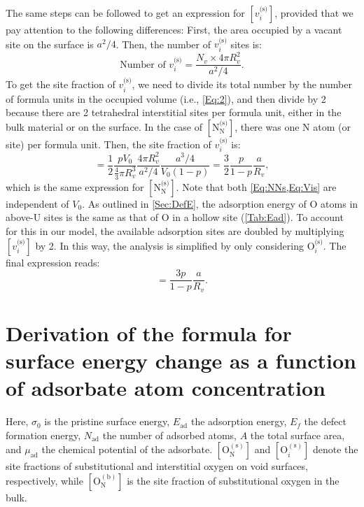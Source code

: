 \documentclass[preprint,12pt,sort&compress]{elsarticle}
\newcommand{\?}{\stackrel{?}{=}}
\begin{document}
The same steps can be followed to get an expression for $[v_i^\text{(s)}]$, provided that we pay attention to the following differences: First, the area occupied by a vacant site on the surface is $a^2/4$. Then, the number of $v_i^\text{(s)}$ sites is:
\begin{equation}
\text{Number of } v_i^\text{(s)} = \frac{ N_v \times 4 \pi R_v^2 }{ a^2 / 4 }.
\end{equation}
To get the site fraction of $v_i^\text{(s)}$, we need to divide its total number by the number of formula units in the occupied volume (i.e., \cref{Eq:2}), and then divide by 2 because there are 2 tetrahedral interstitial sites per formula unit, either in the bulk material or on the surface. In the case of $[ \text{N}_\text{N}^\text{(s)} ]$, there was one N atom (or site) per formula unit. Then, the site fraction of $v_i^\text{(s)}$ is: 
\begin{equation}
[ v_i^\text{(s)} ] = \frac{1}{2} \frac{p V_0}{ \frac{4}{3} \pi R_v^3 } \frac{4 \pi R_v^2}{ a^2/4}  \frac{ a^3/4 }{ V_0 (1 - p) } = \frac{3}{2} \frac{p}{1-p} \frac{a}{R_v},
\label{Eq:Vis}
\end{equation}
which is the same expression for $[ \text{N}_\text{N}^\text{(s)} ]$. Note that both \cref{Eq:NNs,Eq:Vis} are independent of $V_0$. As outlined in \cref{Sec:DefE}, the adsorption energy of O atoms in above-U sites is the same as that of O in a hollow site (\cref{Tab:Ead}). To account for this in our model, the available adsorption sites are doubled by multiplying $[ v_i^\text{(s)} ]$ by 2. In this way, the analysis is simplified by only considering $\text{O}_i^{\text{(s)}}$. The final expression reads:
\begin{equation}
[v_i^{\text{(s)}}] = \frac{3p}{1-p} \frac{a}{R_v}.
\end{equation}

\section{Derivation of the formula for surface energy change as a function of adsorbate atom concentration}
\label{App2}

Here, $\sigma_0$ is the pristine surface energy, $E_\text{ad}$ the adsorption energy, $E_f$ the defect formation energy, $N_\text{ad}$ the number of adsorbed atoms, $A$ the total surface area, and $\mu_\text{ad}$ the chemical potential of the adsorbate. $[\text{O}_\text{N}^{(\text{s})}]$ and $[\text{O}_i^{(\text{s})}]$ denote the site fractions of substitutional and interstitial oxygen on void surfaces, respectively, while $[\text{O}_\text{N}^{(\text{b})}]$ is the site fraction of substitutional oxygen in the bulk.
\end{document}
